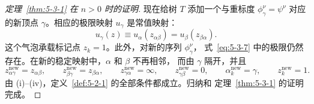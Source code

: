\begin{proof}[定理~\ref{thm:5-3-1} 在 $n>0$ 时的证明]
现在给树 $T$ 添加一个与重标度 $\phi_\gamma^\nu=\psi^\nu$ 对应的新顶点
$\gamma$。相应的极限映射 $u_\gamma$ 是常值映射：
\[
  u_\gamma(z)\equiv u_\alpha(z_{\alpha\beta})=u_\beta(z_{\beta\alpha}).
\]
这个气泡承载标记点 $z_k=1$。此外，对新的序列 $\phi_\gamma^\nu$，
式~\eqref{eq:5-3-7} 中的极限仍然存在。在新的稳定映射中，$\alpha$ 和 $\beta$ 不再相邻，
而由 $\gamma$ 隔开，并且
\[
  z_{\alpha\gamma}^{\mathrm{new}}=z_{\alpha\beta},
  \qquad z_{\beta\gamma}^{\mathrm{new}}=z_{\beta\alpha},
  \qquad z_{\gamma\alpha}^{\mathrm{new}}=\infty,
  \qquad z_{\gamma\beta}^{\mathrm{new}}=0,
  \qquad \alpha_k^{\mathrm{new}}=\gamma,
  \qquad z_k^{\mathrm{new}}=1.
\]
由 (i)--(iv)，定义~\ref{def:5-2-1} 的全部条件都成立。归纳和
定理~\ref{thm:5-3-1} 的证明完成。
\end{proof}
